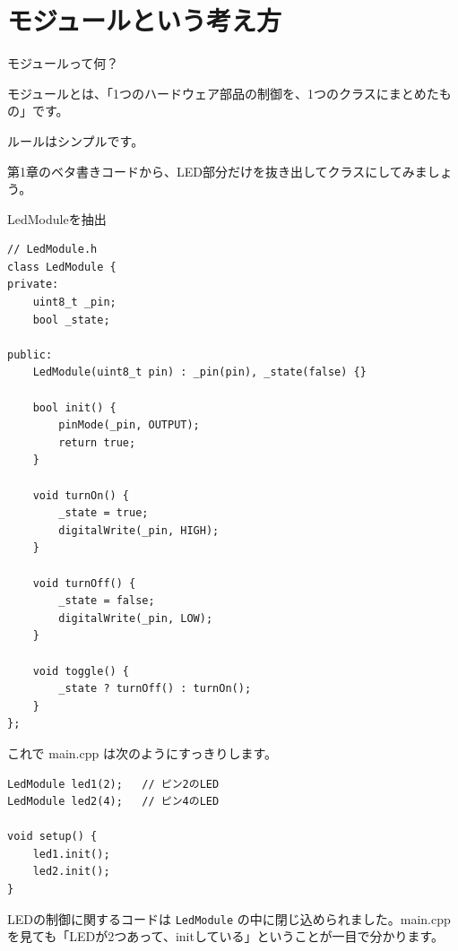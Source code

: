 \section{モジュールという考え方}

\begin{qabox}{モジュールって何？}

モジュールとは、「1つのハードウェア部品の制御を、1つのクラスにまとめたもの」です。

ルールはシンプルです。

\begin{center}
\end{center}

第1章のベタ書きコードから、LED部分だけを抜き出してクラスにしてみましょう。

\begin{goodexample}{LedModuleを抽出}
\begin{lstlisting}
// LedModule.h
class LedModule {
private:
    uint8_t _pin;
    bool _state;

public:
    LedModule(uint8_t pin) : _pin(pin), _state(false) {}

    bool init() {
        pinMode(_pin, OUTPUT);
        return true;
    }

    void turnOn() {
        _state = true;
        digitalWrite(_pin, HIGH);
    }

    void turnOff() {
        _state = false;
        digitalWrite(_pin, LOW);
    }

    void toggle() {
        _state ? turnOff() : turnOn();
    }
};
\end{lstlisting}
\end{goodexample}

これで main.cpp は次のようにすっきりします。

\begin{lstlisting}
LedModule led1(2);   // ピン2のLED
LedModule led2(4);   // ピン4のLED

void setup() {
    led1.init();
    led2.init();
}
\end{lstlisting}

LEDの制御に関するコードは \texttt{LedModule} の中に閉じ込められました。main.cppを見ても「LEDが2つあって、initしている」ということが一目で分かります。

\end{qabox}

